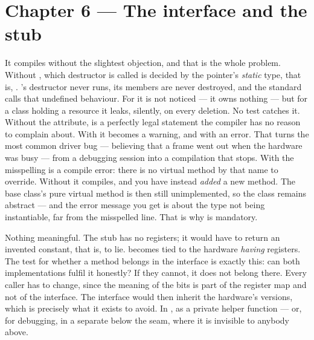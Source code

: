 \section*{Chapter 6 --- The interface and the stub}

 It compiles without the slightest objection, and that is the whole problem. Without
, which destructor is called is decided by the pointer's \emph{static} type, that
is, . 's destructor never runs, its members are never destroyed, and
the standard calls that undefined behaviour. For  it is not noticed --- it owns nothing
--- but for a class holding a resource it leaks, silently, on every deletion. No test catches it.
 Without the attribute,  is a perfectly legal statement the
compiler has no reason to complain about. With \code{[[nodiscard]]} it becomes a warning, and with
 an error. That turns the most common driver bug --- believing that a frame went out
when the hardware was busy --- from a debugging session into a compilation that stops.
 With  the misspelling is a compile error: there is no virtual method by
that name to override. Without  it compiles, and you have instead \emph{added} a
new method. The base class's pure virtual method is then still unimplemented, so the class remains
abstract --- and the error message you get is about the type not being instantiable, far from the
misspelled line. That is why  is mandatory.

 Nothing meaningful. The stub has no registers; it would have to return an invented
constant, that is, to lie.
  becomes tied to the hardware \emph{having} registers. The test for whether
a method belongs in the interface is exactly this: can both implementations fulfil it honestly? If
they cannot, it does not belong there.
 Every caller has to change, since the meaning of the bits is part of the register map and
not of the interface. The interface would then inherit the hardware's versions, which is precisely
what it exists to avoid.
 In , as a private helper function --- or, for debugging, in a separate
 below the  seam, where it is invisible to anybody above.

